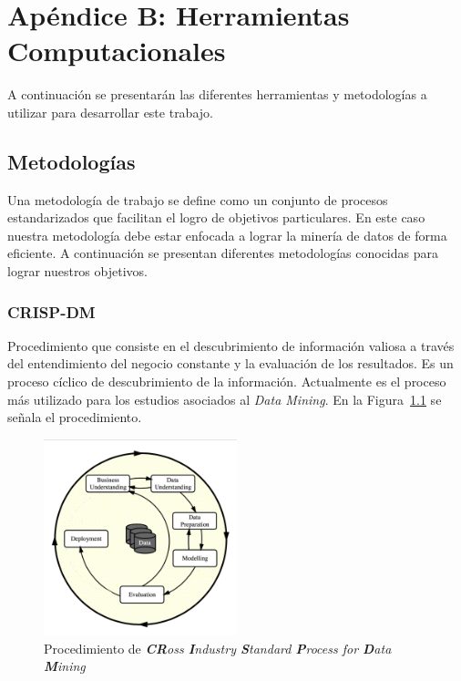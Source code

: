 \chapter{Apéndice B: Herramientas Computacionales}
A continuación se presentarán las diferentes herramientas y metodologías a utilizar para desarrollar este trabajo.
\section{Metodologías}
Una metodología de trabajo se define como un conjunto de procesos estandarizados que facilitan el logro de objetivos particulares. En este caso nuestra metodología debe estar enfocada a lograr la minería de datos de forma eficiente.
A continuación se presentan diferentes metodologías conocidas para lograr nuestros objetivos.
\subsection{CRISP-DM}
Procedimiento que consiste en el descubrimiento de información valiosa a través del entendimiento del negocio constante y la evaluación de los resultados. Es un proceso cíclico de descubrimiento de la información. Actualmente es el proceso más utilizado para los estudios asociados al \textit{Data Mining}\cite{crispol,crispol2,crispol3}. En la Figura~\ref{fig:crisp} se señala el procedimiento.
\begin{figure}[H]
  \centering
    \includegraphics[width=0.5\textwidth]{Figuras/crisp-process}
      \caption{Procedimiento de \textit{\textbf{CR}oss \textbf{I}ndustry \textbf{S}tandard \textbf{P}rocess for \textbf{D}ata \textbf{M}ining}\cite{crisp}}
    \label{fig:crisp}
\end{figure}
